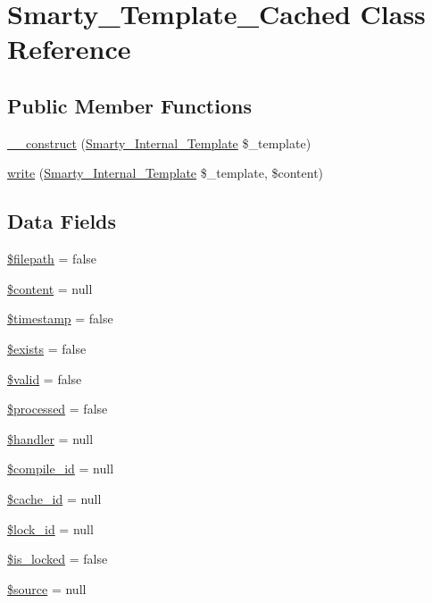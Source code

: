 \hypertarget{class_smarty___template___cached}{}\section{Smarty\+\_\+\+Template\+\_\+\+Cached Class Reference}
\label{class_smarty___template___cached}
\subsection*{Public Member Functions}
\begin{DoxyCompactItemize}
\item 
\hyperlink{class_smarty___template___cached_a196206b3d73442281cb1f1e0e30fa151}{\+\_\+\+\_\+construct} (\hyperlink{class_smarty___internal___template}{Smarty\+\_\+\+Internal\+\_\+\+Template} \$\+\_\+template)
\item 
\hyperlink{class_smarty___template___cached_a2c068c2178871b7ecce0db798826fa40}{write} (\hyperlink{class_smarty___internal___template}{Smarty\+\_\+\+Internal\+\_\+\+Template} \$\+\_\+template, \$content)
\end{DoxyCompactItemize}
\subsection*{Data Fields}
\begin{DoxyCompactItemize}
\item 
\hyperlink{class_smarty___template___cached_a3bce02156476bcca5e7573793b12226c}{\$filepath} = false
\item 
\hyperlink{class_smarty___template___cached_a57b284fe00866494b33afa80ba729bed}{\$content} = null
\item 
\hyperlink{class_smarty___template___cached_a2b69de9676dd97c675cd4d9bcceb684c}{\$timestamp} = false
\item 
\hyperlink{class_smarty___template___cached_a9af419fd2ea17d70b30ccfca4e6c1496}{\$exists} = false
\item 
\hyperlink{class_smarty___template___cached_a0587674d27d00ef497e08e53ccf45bbb}{\$valid} = false
\item 
\hyperlink{class_smarty___template___cached_aac44a4d5065e07e9a7a51ce8ef4a5c71}{\$processed} = false
\item 
\hyperlink{class_smarty___template___cached_a9285a7f684c72e9bb78fdef1bcbe3fd0}{\$handler} = null
\item 
\hyperlink{class_smarty___template___cached_a4c29af6f98e3049de95861b01a7bb00d}{\$compile\+\_\+id} = null
\item 
\hyperlink{class_smarty___template___cached_aabdcf0100ec4fce78371b883f0c6cbf8}{\$cache\+\_\+id} = null
\item 
\hyperlink{class_smarty___template___cached_ab21d62ae637587b52ac4c36881f15f44}{\$lock\+\_\+id} = null
\item 
\hyperlink{class_smarty___template___cached_a28c289cfe9578489fe6f84e8a3d6386f}{\$is\+\_\+locked} = false
\item 
\hyperlink{class_smarty___template___cached_a99a2b085f0a29bd5d799fdcbb63d261b}{\$source} = null
\end{DoxyCompactItemize}


